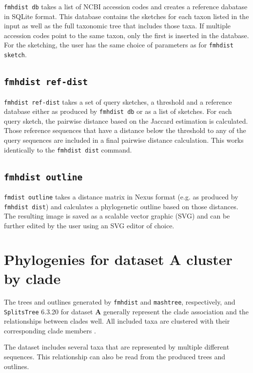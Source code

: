\texttt{fmhdist db} takes a list of NCBI accession codes and creates a reference
dabatase in SQLite format. This database contains the sketches for each taxon
listed in the input as well as the full taxonomic tree that includes those taxa.
If multiple accession codes point to the same taxon, only the first is inserted
in the database. For the sketching, the user has the same choice of parameters
as for \texttt{fmhdist sketch}.

\subsection*{\texttt{fmhdist ref-dist}}

\texttt{fmhdist ref-dist} takes a set of query sketches, a threshold and a
reference database either as produced by \texttt{fmhdist db} or as a list of
sketches. For each query sketch, the pairwise distance based on the Jaccard
estimation is calculated. Those reference sequences that have a distance below
the threshold to any of the query sequences are included in a final pairwise
distance calculation. This works identically to the \texttt{fmhdist dist}
command.

\subsection*{\texttt{fmhdist outline}}

\texttt{fmdist outline} takes a distance matrix in Nexus format (e.g. as
produced by \texttt{fmhdist dist}) and calculates a phylogenetic outline based
on those distances. The resulting image is saved as a scalable vector graphic
(SVG) and can be further edited by the user using an SVG editor of choice.

\section{Phylogenies for dataset \textbf{A} cluster by clade} The trees and
outlines generated by \texttt{fmhdist} and \texttt{mashtree}, respectively, and
\texttt{SplitsTree} 6.3.20
\cite{husonApplicationPhylogeneticNetworks2006,bagciMicrobialPhylogeneticContext2021}
for dataset \textbf{A }generally represent the clade association and the
relationships between clades well. All included taxa are clustered with their
corresponding clade members
\cite{abadPhytophthoraTaxonomicPhylogenetic2023a,yangExpandedPhylogenyGenus2017}.

The dataset includes several taxa that are represented by multiple different
sequences. This relationship can also be read from the produced trees and
outlines.


